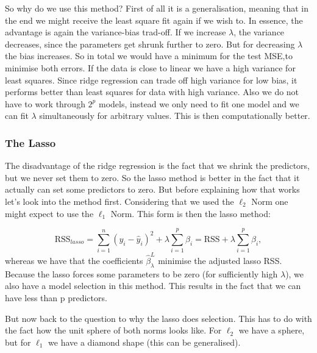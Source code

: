 \documentclass{article}
\begin{document}
 So why do we use this method?
 First of all it is a generalisation, meaning that in the end we might receive the least square fit again if we wish to. In essence, the advantage is again the variance-bias trad-off. If we increase $\lambda$, the variance decreases, since the parameters get shrunk further to zero. But for decreasing $\lambda$ the bias increases. So in total we would have a minimum for the test MSE,to minimise both errors. If the data is close to linear we have a high variance for least squares. Since ridge regression can trade off high variance for low bias, it performs better than least squares for data with high variance. Also we do not have to work through $2^p$ models, instead we only need to fit one model and we can fit $\lambda$ simultaneously for arbitrary values. This is then computationally better.
 
 \subsubsection{The Lasso}
 The disadvantage of the ridge regression is the fact that we shrink the predictors, but we never set them to zero. So the lasso method is better in the fact that it actually can set some predictors to zero. But before explaining how that works let's look into the method first. Considering that we used the $\ell_2$ Norm one might expect to use the $\ell_1$ Norm. This form is then the lasso method:
 
 \begin{equation}
     \text{RSS}_{lasso} = \sum _ {i=1}^n (y_i-\hat{y}_i)^2 +\lambda \sum_{i=1}^p  \beta_i =  \text{RSS} + \lambda \sum_{i=1}^p \beta_i,
 \end{equation}
whereas we have that the coefficients $\hat{\beta}_\lambda^L$ minimise the adjusted lasso RSS. Because the lasso forces some parameters to be zero (for sufficiently high $\lambda$), we also have a model selection in this method. This results in the fact that we can have less than p predictors.

But now back to the question to why the lasso does selection. This has to do with the fact how the unit sphere of both norms looks like. For $\ell_2$ we have a sphere, but for $\ell_1$ we have a diamond shape (this can be generalised).
\end{document}

